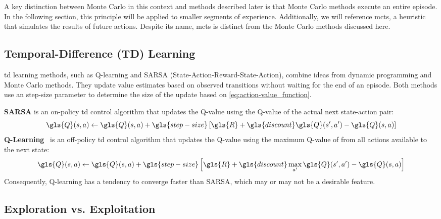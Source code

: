 A key distinction between Monte Carlo in this context and methods described 
later is that Monte Carlo methods execute an entire episode. In the following 
section, this principle will be applied to smaller segments of experience. 
Additionally, we will reference \gls{mcts}, 
a heuristic that simulates the results of future actions. Despite its name, 
\gls{mcts} is distinct from the Monte Carlo methods discussed here.

    \subsection*{Temporal-Difference (TD) Learning}%

\Gls{td} learning methods, such as Q-learning and SARSA 
(State-Action-Reward-State-Action), combine ideas from 
dynamic programming and Monte Carlo methods. They update value estimates 
based on observed transitions without waiting for the end of an episode.
Both methods use an \gls{step-size} parameter to determine the size of 
the update based on \cref{eq:action-value_function}.

\textbf{SARSA} is an on-policy \gls{td} control algorithm that updates the 
\gls{Q}-value using the \gls{Q}-value of the actual next state-action pair:
%
\begin{equation}
    \gls{Q}(s, a) \leftarrow \gls{Q}(s, a) + \gls{step-size} \left[ 
        \gls{R} + \gls{discount} \gls{Q}(s^\prime, a^\prime) - \gls{Q}(s, a) 
    \right]
    \label{eq:sarsa_action-value}
\end{equation}
%
\textbf{Q-Learning}~\cite{watkins1992} is an off-policy \gls{td} control 
algorithm that updates the \gls{Q}-value using the maximum \gls{Q}-value of 
from all actions available to the next state:
%
\begin{equation}
    \gls{Q}(s, a) \leftarrow \gls{Q}(s, a) + \gls{step-size} \left[ 
        \gls{R} + \gls{discount} \max_{a^\prime} 
        \gls{Q}(s^\prime, a^\prime) - \gls{Q}(s, a)
    \right]
    \label{eq:q-learning_action-value}
\end{equation}
%
Consequently, Q-learning has a tendency to converge faster than SARSA,
which may or may not be a desirable feature.

    \subsection*{Exploration vs. Exploitation}

